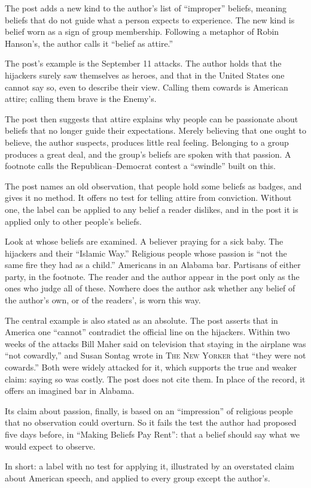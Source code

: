 \begin{afterword}
\summaryhead

The post adds a new kind to the author's list of ``improper'' beliefs, meaning beliefs that do not guide what a person expects to experience. The new kind is belief worn as a sign of group membership. Following a metaphor of Robin Hanson's, the author calls it ``belief as attire.''

The post's example is the September 11 attacks. The author holds that the hijackers surely saw themselves as heroes, and that in the United States one cannot say so, even to describe their view. Calling them cowards is American attire; calling them brave is the Enemy's.

The post then suggests that attire explains why people can be passionate about beliefs that no longer guide their expectations. Merely believing that one ought to believe, the author suspects, produces little real feeling. Belonging to a group produces a great deal, and the group's beliefs are spoken with that passion. A footnote calls the Republican--Democrat contest a ``swindle'' built on this.

\responsehead

The post names an old observation, that people hold some beliefs as badges, and gives it no method. It offers no test for telling attire from conviction. Without one, the label can be applied to any belief a reader dislikes, and in the post it is applied only to other people's beliefs.

Look at whose beliefs are examined. A believer praying for a sick baby. The hijackers and their ``Islamic Way.'' Religious people whose passion is ``not the same fire they had as a child.'' Americans in an Alabama bar. Partisans of either party, in the footnote. The reader and the author appear in the post only as the ones who judge all of these. Nowhere does the author ask whether any belief of the author's own, or of the readers', is worn this way.

The central example is also stated as an absolute. The post asserts that in America one ``cannot'' contradict the official line on the hijackers. Within two weeks of the attacks Bill Maher said on television that staying in the airplane was ``not cowardly,'' and Susan Sontag wrote in \textsc{The New Yorker} that ``they were not cowards.'' Both were widely attacked for it, which supports the true and weaker claim: saying so was costly. The post does not cite them. In place of the record, it offers an imagined bar in Alabama.

Its claim about passion, finally, is based on an ``impression'' of religious people that no observation could overturn. So it fails the test the author had proposed five days before, in ``Making Beliefs Pay Rent'': that a belief should say what we would expect to observe.

In short: a label with no test for applying it, illustrated by an overstated claim about American speech, and applied to every group except the author's.
\end{afterword}

